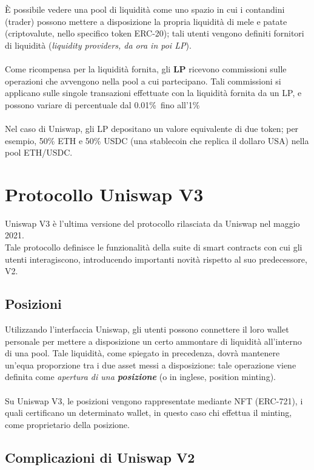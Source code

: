 \documentclass[12pt,a4paper]{report}
\begin{document}
È possibile vedere una pool di liquidità come uno spazio in cui i contandini (trader) possono mettere a disposizione la propria liquidità di mele e patate (criptovalute, nello specifico token ERC-20\cite{erc_20}); tali utenti vengono definiti fornitori di liquidità (\textit{liquidity providers, da ora in poi LP}).
\\\\Come ricompensa per la liquidità fornita, gli \textbf{LP} ricevono commissioni sulle operazioni che avvengono nella pool a cui partecipano. 
Tali commissioni si applicano sulle singole transazioni effettuate con la liquidità fornita da un LP, e possono variare di percentuale dal 0.01\%\ fino all'1\%\.\\\\Nel caso di Uniswap, gli LP depositano un valore equivalente di due token; per esempio, 50\% ETH e 50\% USDC (una stablecoin che replica il dollaro USA) nella pool ETH/USDC.


\section{Protocollo Uniswap V3}

Uniswap V3 è l'ultima versione del protocollo rilasciata da Uniswap nel maggio 2021\cite{uniswap}.\\ Tale protocollo definisce le funzionalità della suite di smart contracts con cui gli utenti interagiscono, introducendo importanti novità rispetto al suo predecessore, V2.

\subsection{Posizioni}

Utilizzando l'interfaccia Uniswap, gli utenti possono connettere il loro wallet personale per mettere a disposizione un certo ammontare di liquidità all'interno di una pool.
Tale liquidità, come spiegato in precedenza, dovrà mantenere un'equa proporzione tra i due asset messi a disposizione: tale operazione viene definita come \textit{apertura di una \textbf{posizione}} (o in inglese, position minting).
\\\\Su Uniswap V3, le posizioni vengono rappresentate mediante NFT (ERC-721\cite{erc_721}), i quali certificano un determinato wallet, in questo caso chi effettua il minting, come proprietario della posizione.

\subsection{Complicazioni di Uniswap V2}
\end{document}
